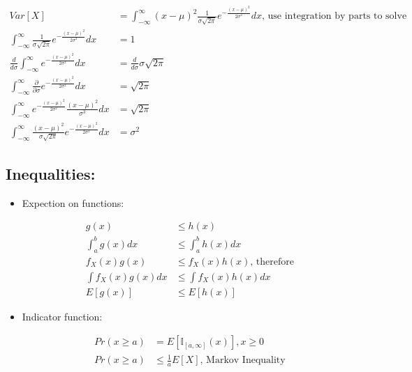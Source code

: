 \documentclass[11pt,letterpaper,titlepage]{article}
\begin{document}
\begin{itemize}
    \begin{equation*}
        \begin{aligned}
            Var[X] &=\int_{-\infty}^{\infty} (x - \mu)^2 \frac{1}{\sigma \sqrt{2\pi}} e^{-\frac{(x-\mu)^2}{2\sigma^2}} dx \text{, use integration by parts to solve} \\
            \int_{-\infty}^{\infty} \frac{1}{\sigma \sqrt{2\pi}} e^{-\frac{(x-\mu)^2}{2\sigma^2}} dx &= 1 \\
            \frac{d}{d\sigma} \int_{-\infty}^{\infty} e^{-\frac{(x-\mu)^2}{2\sigma^2}} dx &= \frac{d}{d\sigma} \sigma \sqrt{2\pi} \\
            \int_{-\infty}^{\infty} \frac{\partial}{\partial \sigma} e^{-\frac{(x-\mu)^2}{2\sigma^2}} dx &= \sqrt{2\pi} \\
            \int_{-\infty}^{\infty} e^{-\frac{(x-\mu)^2}{2\sigma^2}} \frac{(x-\mu)^2}{\sigma^3} dx &= \sqrt{2\pi} \\
            \int_{-\infty}^{\infty} \frac{(x-\mu)^2}{\sigma\sqrt{2\pi}} e^{-\frac{(x-\mu)^2}{2\sigma^2}} dx &= \sigma^2
        \end{aligned}
    \end{equation*}
    
\end{itemize}

\subsection{Inequalities:}

\begin{itemize}

    \item Expection on functions:
    
    \begin{equation*}
        \begin{aligned}
            g(x) &\leq h(x) \\
            \int_{a}^{b} g(x) dx &\leq \int_{a}^{b} h(x) dx \\
            f_X(x) g(x) &\leq f_X(x) h(x) \text{, therefore} \\
            \int f_X(x) g(x) dx &\leq \int f_X(x) h(x) dx \\
            E[g(x)] &\leq E[h(x)]
        \end{aligned}
    \end{equation*}

    \item Indicator function:
    
    \begin{equation*}
        \begin{aligned}
            Pr(x \geq a) &= E[\mathbb{I}_{[a, \infty]}(x)], x \geq 0 \\
            Pr(x \geq a) &\leq \frac{1}{a} E[X] \text{, Markov Inequality}
        \end{aligned}
    \end{equation*}

\end{itemize}
\end{document}
